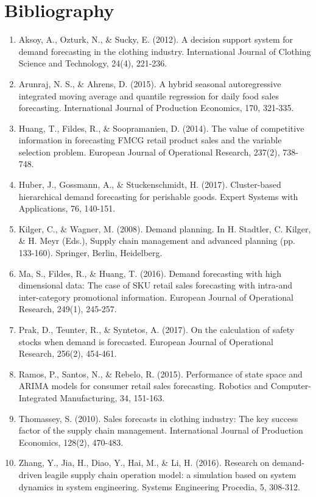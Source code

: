 \documentclass{article}
\begin{document}
\section{Bibliography}

\begin{enumerate}
  \item Aksoy, A., Ozturk, N., \& Sucky, E. (2012). A decision support system for demand forecasting in the clothing industry. International Journal of Clothing Science and Technology, 24(4), 221-236.
  \item Arunraj, N. S., \& Ahrens, D. (2015). A hybrid seasonal autoregressive integrated moving average and quantile regression for daily food sales forecasting. International Journal of Production Economics, 170, 321-335.
  \item Huang, T., Fildes, R., \& Soopramanien, D. (2014). The value of competitive information in forecasting FMCG retail product sales and the variable selection problem. European Journal of Operational Research, 237(2), 738-748.
  \item Huber, J., Gossmann, A., \& Stuckenschmidt, H. (2017). Cluster-based hierarchical demand forecasting for perishable goods. Expert Systems with Applications, 76, 140-151.
  \item Kilger, C., \& Wagner, M. (2008). Demand planning. In H. Stadtler, C. Kilger, \& H. Meyr (Eds.), Supply chain management and advanced planning (pp. 133-160). Springer, Berlin, Heidelberg.
  \item Ma, S., Fildes, R., \& Huang, T. (2016). Demand forecasting with high dimensional data: The case of SKU retail sales forecasting with intra-and inter-category promotional information. European Journal of Operational Research, 249(1), 245-257.
  \item Prak, D., Teunter, R., \& Syntetos, A. (2017). On the calculation of safety stocks when demand is forecasted. European Journal of Operational Research, 256(2), 454-461.
  \item Ramos, P., Santos, N., \& Rebelo, R. (2015). Performance of state space and ARIMA models for consumer retail sales forecasting. Robotics and Computer-Integrated Manufacturing, 34, 151-163.
  \item Thomassey, S. (2010). Sales forecasts in clothing industry: The key success factor of the supply chain management. International Journal of Production Economics, 128(2), 470-483.
  \item Zhang, Y., Jia, H., Diao, Y., Hai, M., \& Li, H. (2016). Research on demand-driven leagile supply chain operation model: a simulation based on system dynamics in system engineering. Systems Engineering Procedia, 5, 308-312.
\end{enumerate}
\end{document}
